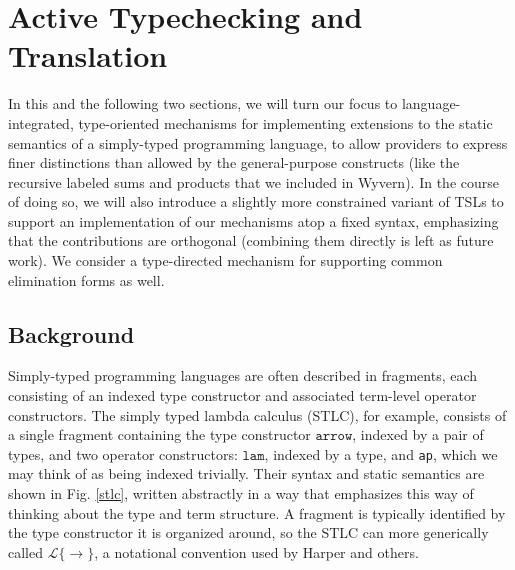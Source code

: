


\section{Active Typechecking and Translation}\label{att}
In this and the following two sections, we will turn our focus to language-integrated, type-oriented mechanisms for implementing extensions to the static semantics of a simply-typed programming language, to allow providers to express finer distinctions than allowed by the general-purpose constructs (like the recursive labeled sums and products that we included in Wyvern). In the course of doing so, we will also introduce a slightly more constrained variant of TSLs to support an implementation of our mechanisms atop a fixed syntax, emphasizing that the contributions are orthogonal (combining them directly is left as future work). We consider a type-directed mechanism for supporting common elimination forms as well.%
\subsection{Background}
Simply-typed programming languages are often described in fragments, each consisting of an indexed type constructor and associated term-level operator constructors. The simply typed lambda calculus (STLC), for example, consists of a single fragment containing the type constructor $\mathtt{arrow}$, indexed by a pair of types, and two operator constructors: $\mathtt{lam}$, indexed by a type, and \verb|ap|, which we may think of as being indexed trivially. Their syntax and static semantics are shown in Fig. \ref{stlc}, written abstractly in a way that emphasizes this way of thinking about the type and term structure. A fragment is typically identified by the type constructor it is organized around, so the STLC can more generically called $\mathcal{L}\{\rightarrow\}$, a notational convention used by Harper \cite{pfpl} and others. 

